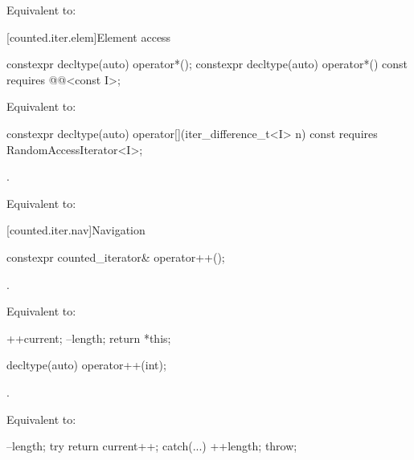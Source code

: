 \documentclass{wg21}
\begin{document}
\begin{itemdescr}
	\pnum
	\effects Equivalent to: 
\end{itemdescr}

[counted.iter.elem]{Element access}

%
\begin{itemdecl}
	constexpr decltype(auto) operator*();
	constexpr decltype(auto) operator*() const
	requires @@<const I>;
\end{itemdecl}

\begin{itemdescr}
	\pnum
	\effects Equivalent to: 
\end{itemdescr}

%
\begin{itemdecl}
	constexpr decltype(auto) operator[](iter_difference_t<I> n) const
	requires RandomAccessIterator<I>;
\end{itemdecl}

\begin{itemdescr}
	\pnum
	\expects {}.
	
	\pnum
	\effects Equivalent to: 
\end{itemdescr}

[counted.iter.nav]{Navigation}

%
\begin{itemdecl}
	constexpr counted_iterator& operator++();
\end{itemdecl}

\begin{itemdescr}
	\pnum
	\expects {}.
	
	\pnum
	\effects Equivalent to:
	\begin{codeblock}
		++current;
		--length;
		return *this;
	\end{codeblock}
\end{itemdescr}

%
\begin{itemdecl}
	decltype(auto) operator++(int);
\end{itemdecl}

\begin{itemdescr}
	\pnum
\begin{addedm}
	\mandates {}
\end{addedm}
	
	\expects {}.
	
	\pnum
	\effects Equivalent to:
	\begin{codeblock}
		--length;
		try { return current++; }
		catch(...) { ++length; throw; }
	\end{codeblock}
\end{itemdescr}
\end{document}
